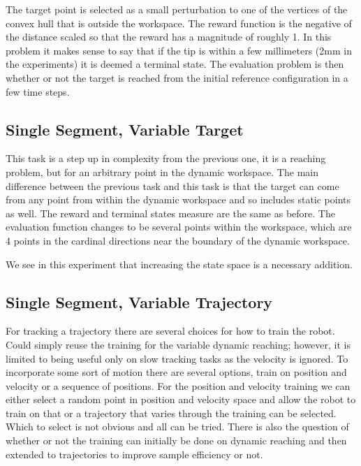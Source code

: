 \documentclass[letterpaper, 10 pt, conference]{ieeeconf}  %
\begin{document}
The target point is selected as a small perturbation to one of the vertices of the convex hull that is outside the workspace. The reward function is the negative of the distance scaled so that the reward has a magnitude of roughly 1. In this problem it makes sense to say that if the tip is within a few millimeters (2mm in the experiments) it is deemed a terminal state. The evaluation problem is then whether or not the target is reached from the initial reference configuration in a few time steps.

\subsection{Single Segment, Variable Target}

This task is a step up in complexity from the previous one, it is a reaching problem, but for an arbitrary point in the dynamic workspace. The main difference between the previous task and this task is that the target can come from any point from within the dynamic workspace and so includes static points as well. The reward and terminal states measure are the same as before. The evaluation function changes to be several points within the workspace, which are 4 points in the cardinal directions near the boundary of the dynamic workspace. 

We see in this experiment that increasing the state space is a necessary addition.

\subsection{Single Segment, Variable Trajectory}

For tracking a trajectory there are several choices for how to train the robot. Could simply reuse the training for the variable dynamic reaching; however, it is limited to being useful only on slow tracking tasks as the velocity is ignored. To incorporate some sort of motion there are several options, train on position and velocity or a sequence of positions. For the position and velocity training we can either select a random point in position and velocity space and allow the robot to train on that or a trajectory that varies through the training can be selected. Which to select is not obvious and all can be tried. There is also the question of whether or not the training can initially be done on dynamic reaching and then extended to trajectories to improve sample efficiency or not.
\end{document}
